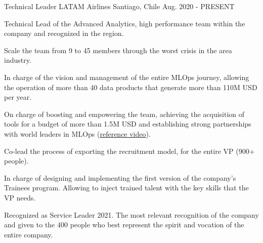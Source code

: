 

\begin{cventries}
  \cventry
    {Technical Leader} %
    {LATAM Airlines} %
    {Santiago, Chile} %
    {Aug. 2020 - PRESENT} %
    {
      \begin{cvitems} %
        \item {Technical Lead of the Advanced Analytics, high performance team within the company and recognized in the region. }
        \item {Scale the team from 9 to 45 members through the worst crisis in the area industry.}
        \item {In charge of the vision and management of the entire MLOps journey, allowing the operation of more than 40 data products that generate more than 110M USD per year.}
        \item {On charge of boosting and empowering the team, achieving the acquisition of tools for a budget of more than 1.5M USD and establishing strong partnerships with world leaders in MLOps (\href{https://youtu.be/kagDKNto1c4}{reference video}).}
        \item {Co-lead the process of exporting the recruitment model, for the entire VP (900+ people).}
        \item {In charge of designing and implementing the first version of the company's Trainees program. Allowing to inject trained talent with the key skills that the VP needs.}
      	\item {Recognized as Service Leader 2021. The most relevant recognition of the company and given to the 400 people who best represent the spirit and vocation of the entire company.}
      \end{cvitems}
    }


\end{cventries}
